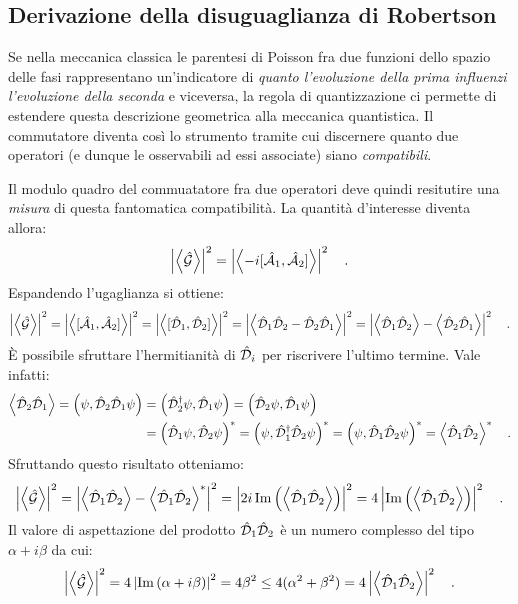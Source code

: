 \subsection{Derivazione della disuguaglianza di Robertson}
Se nella meccanica classica le parentesi di Poisson fra due funzioni dello spazio delle fasi rappresentano un'indicatore di \emph{quanto l'evoluzione della prima influenzi l'evoluzione della seconda} e viceversa, la regola di quantizzazione ci permette di estendere questa descrizione geometrica alla meccanica quantistica. Il commutatore diventa così lo strumento tramite cui discernere quanto due operatori (e dunque le osservabili ad essi associate) siano \emph{compatibili}. 

Il modulo quadro del commuatatore fra due operatori deve quindi resitutire una \emph{misura} di questa fantomatica compatibilità. La quantità d'interesse diventa allora:
\[
    \left| \left\langle \hat{\mathcal{G}} \right\rangle \right|^2 = \left| \left\langle -i[\hat{\mathcal{A}}_1, \hat{\mathcal{A}}_2] \right\rangle \right|^2 \quad.
\]
Espandendo l'ugaglianza si ottiene:
\[
        \left| \left\langle \hat{\mathcal{G}} \right\rangle \right|^2 = \left| \left\langle [\hat{\mathcal{A}}_1, \hat{\mathcal{A}}_2] \right\rangle \right|^2 = \left| \left\langle [\hat{\mathcal{D}}_1, \hat{\mathcal{D}}_2] \right\rangle \right|^2 = \left| \left\langle \hat{\mathcal{D}}_1\hat{\mathcal{D}}_2 - \hat{\mathcal{D}}_2\hat{\mathcal{D}}_1 \right\rangle \right|^2 = \left|\left\langle \hat{\mathcal{D}}_1\hat{\mathcal{D}}_2 \right\rangle - \left\langle \hat{\mathcal{D}}_2\hat{\mathcal{D}}_1 \right\rangle \right|^2 \quad.
\]
È possibile sfruttare l'hermitianità di $\hat{\mathcal{D}}_i$ per riscrivere l'ultimo termine. Vale infatti:
\[
\begin{aligned}
    \left\langle \hat{\mathcal{D}}_2\hat{\mathcal{D}}_1 \right\rangle = \left( \psi, \hat{\mathcal{D}}_2\hat{\mathcal{D}}_1 \psi \right) &= \left(\hat{\mathcal{D}}^\dagger_2 \psi, \hat{\mathcal{D}}_1 \psi \right) = \left(\hat{\mathcal{D}}_2 \psi, \hat{\mathcal{D}}_1 \psi \right) \\
    &= \left(\hat{\mathcal{D}}_1 \psi, \hat{\mathcal{D}}_2 \psi \right)^* = \left(\psi, \hat{\mathcal{D}}^\dagger_1\hat{\mathcal{D}}_2 \psi \right)^* = \left(\psi, \hat{\mathcal{D}}_1\hat{\mathcal{D}}_2 \psi \right)^* = \left\langle \hat{\mathcal{D}}_1\hat{\mathcal{D}}_2 \right\rangle^* \quad.
\end{aligned}
\]
Sfruttando questo risultato otteniamo:
\[
    \begin{aligned}
        \left| \left\langle \hat{\mathcal{G}} \right\rangle \right|^2 = \left|\left\langle \hat{\mathcal{D}}_1\hat{\mathcal{D}}_2 \right\rangle - \left\langle \hat{\mathcal{D}}_1\hat{\mathcal{D}}_2 \right\rangle^* \right|^2 = \left|2i\operatorname{Im}\left(\left\langle \hat{\mathcal{D}}_1\hat{\mathcal{D}}_2 \right\rangle\right) \right|^2 = 4\left|\operatorname{Im}\left(\left\langle \hat{\mathcal{D}}_1\hat{\mathcal{D}}_2 \right\rangle\right) \right|^2 \quad.
    \end{aligned}
\] 
Il valore di aspettazione del prodotto $\hat{\mathcal{D}}_1 \hat{\mathcal{D}}_2$ è un numero complesso del tipo $\alpha + i\beta$ da cui:
\[
    \begin{aligned}
        \left| \left\langle \hat{\mathcal{G}} \right\rangle \right|^2 = 4\left|\operatorname{Im}\left(\alpha + i\beta\right) \right|^2 = 4\beta^2 \leq 4(\alpha^2 + \beta^2) = 4\left| \left\langle \hat{\mathcal{D}}_1\hat{\mathcal{D}}_2 \right\rangle \right|^2 \quad.
    \end{aligned}
\]
